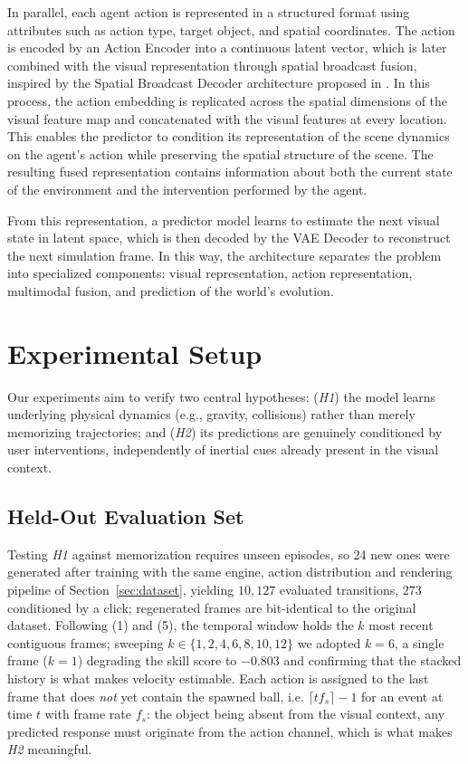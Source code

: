 \documentclass[conference]{IEEEtran}
\begin{document}
In parallel, each agent action is represented in a structured format using attributes such as action type, target object, and spatial coordinates. The action is encoded by an Action Encoder into a continuous latent vector, which is later combined with the visual representation through spatial broadcast fusion, inspired by the Spatial Broadcast Decoder architecture proposed in \cite{watters2019spatial}. In this process, the action embedding is replicated across the spatial dimensions of the visual feature map and concatenated with the visual features at every location. This enables the predictor to condition its representation of the scene dynamics on the agent's action while preserving the spatial structure of the scene. The resulting fused representation contains information about both the current state of the environment and the intervention performed by the agent.

From this representation, a predictor model learns to estimate the next visual state in latent space, which is then decoded by the VAE Decoder to reconstruct the next simulation frame. In this way, the architecture separates the problem into specialized components: visual representation, action representation, multimodal fusion, and prediction of the world's evolution.


\section{Experimental Setup}
\label{sec:experimental_setup}

Our experiments aim to verify two central hypotheses: (\textit{H1}) the model learns underlying physical dynamics (e.g., gravity, collisions) rather than merely memorizing trajectories; and (\textit{H2}) its predictions are genuinely conditioned by user interventions, independently of inertial cues already present in the visual context.

\subsection{Held-Out Evaluation Set}

Testing \textit{H1} against memorization requires unseen episodes, so 24 new ones were generated after training with the same engine, action distribution and rendering pipeline of Section~\ref{sec:dataset}, yielding $10{,}127$ evaluated transitions, $273$ conditioned by a click; regenerated frames are bit-identical to the original dataset. Following (1) and (5), the temporal window holds the $k$ most recent contiguous frames; sweeping $k \in \{1,2,4,6,8,10,12\}$ we adopted $k=6$, a single frame ($k=1$) degrading the skill score to $-0.803$ and confirming that the stacked history is what makes velocity estimable. Each action is assigned to the last frame that does \emph{not} yet contain the spawned ball, i.e. $\lceil t f_s \rceil - 1$ for an event at time $t$ with frame rate $f_s$: the object being absent from the visual context, any predicted response must originate from the action channel, which is what makes \textit{H2} meaningful.
\end{document}
